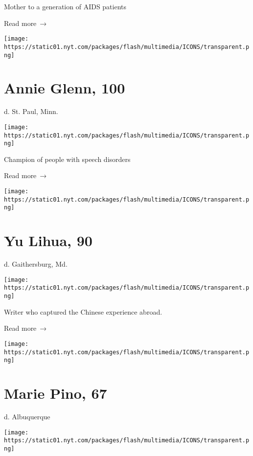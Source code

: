 Mother to a generation of AIDS patients

 Read more~→

\href{https://www.nytimes.com/2020/05/19/us/annie-glenn-champion-of-those-with-speech-disorders-dies-at-100.html}{}

\texttt{[image: https://static01.nyt.com/packages/flash/multimedia/ICONS/transparent.png]}

\hypertarget{annie-glenn-100}{%
\section{Annie Glenn, 100}\label{annie-glenn-100}}

d. St. Paul, Minn.

\texttt{[image: https://static01.nyt.com/packages/flash/multimedia/ICONS/transparent.png]}

Champion of people with speech disorders

 Read more~→

\href{https://www.nytimes.com/2020/05/19/world/asia/yu-lihua-90-dies-writer-spoke-to-rootless-chinese-emigres.html}{}

\texttt{[image: https://static01.nyt.com/packages/flash/multimedia/ICONS/transparent.png]}

\hypertarget{yu-lihua-90}{%
\section{Yu Lihua, 90}\label{yu-lihua-90}}

d. Gaithersburg, Md.

\texttt{[image: https://static01.nyt.com/packages/flash/multimedia/ICONS/transparent.png]}

Writer who captured the Chinese experience abroad.

 Read more~→

\href{https://www.nytimes.com/2020/05/19/obituaries/marie-pino-dead-coronavirus.html}{}

\texttt{[image: https://static01.nyt.com/packages/flash/multimedia/ICONS/transparent.png]}

\hypertarget{marie-pino-67}{%
\section{Marie Pino, 67}\label{marie-pino-67}}

d. Albuquerque

\texttt{[image: https://static01.nyt.com/packages/flash/multimedia/ICONS/transparent.png]}

